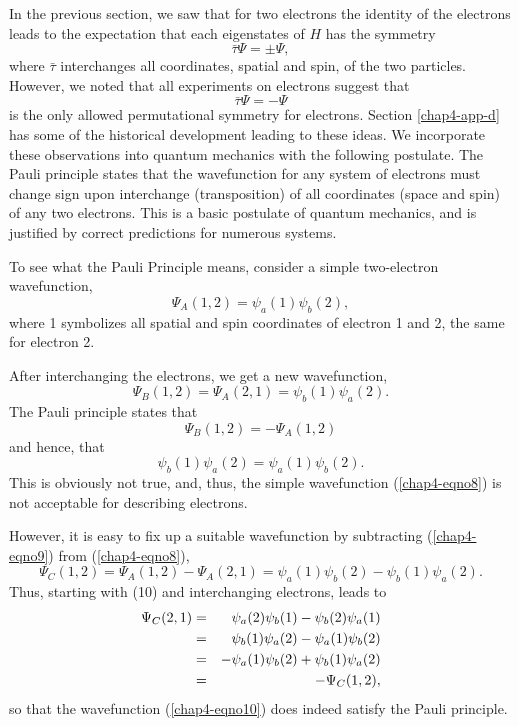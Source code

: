 In the previous section, we saw that for two electrons the identity of 
the electrons leads to the expectation that each eigenstates of $H$ has 
the symmetry
\begin{equation}
{\bar \tau} \Psi = \pm \Psi ,
\end{equation}
where ${\bar \tau}$ interchanges all coordinates, spatial and spin, of the 
two particles.  However, we noted that all experiments on electrons suggest 
that
\begin{equation}
{\bar \tau} \Psi = - \Psi
\end{equation}
is the only allowed permutational symmetry for electrons. Section
\ref{chap4-app-d} has some of the historical development leading to
these ideas. We incorporate these observations into quantum mechanics
with the following postulate.  The Pauli principle states that the
wavefunction for any system of electrons must change sign upon
interchange (transposition) of all coordinates (space and spin) of any
two electrons. This is a basic postulate of quantum mechanics, and is
justified by correct predictions for numerous systems.

To see what the Pauli Principle means, consider a simple two-electron 
wavefunction,
\begin{equation}
\Psi_A (1 , 2 ) = \psi_a (1) \psi_b (2) ,
\label{chap4-eqno8}
\end{equation}
where 1 symbolizes all spatial and spin coordinates of electron 1 and 2, 
the same for electron 2.

After interchanging the electrons, we get a new wavefunction,
\begin{equation}
\Psi_B (1,2) = \Psi_A (2,1) = \psi_b(1) \psi_a (2).
\label{chap4-eqno9}
\end{equation}
The Pauli principle states that
\begin{equation}
\Psi_B (1,2) = - \Psi_A (1,2)
\end{equation}
and hence, that
\begin{equation}
\psi_b (1) \psi_a (2)  = \psi_a (1) \psi_b (2) .
\end{equation}
This is obviously not true, and, thus, the simple wavefunction
(\ref{chap4-eqno8}) is not acceptable for describing electrons.

However, it is easy to fix up a suitable wavefunction by subtracting
(\ref{chap4-eqno9}) from (\ref{chap4-eqno8}),
\begin{equation}
\Psi_C (1,2) = \Psi_A (1,2) - \Psi_A (2,1) = \psi_a (1) \psi_b (2) - 
\psi_b (1) \psi_a (2).
\label{chap4-eqno10}
\end{equation}
Thus, starting with (10) and interchanging electrons, leads to
\begin{eqnarray}
\Psi_C (2,1) &=& \psi_a (2) \psi_b (1) - \psi_b (2) \psi_a (1)\cr
&=& \psi_b (1) \psi_a (2) - \psi_a (1) \psi_b (2)\cr
&=& - \psi_a (1) \psi_b (2) + \psi_b (1) \psi_a (2)\cr
&=& - \Psi_C (1,2),
\end{eqnarray}
so that the wavefunction (\ref{chap4-eqno10}) does indeed satisfy the
Pauli principle.

